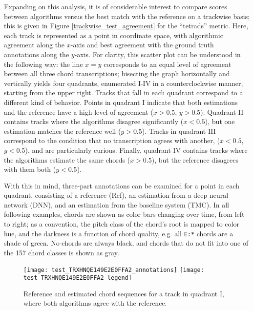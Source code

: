 Expanding on this analysis, it is of considerable interest to compare scores between algorithms versus the best match with the reference on a trackwise basis; this is given in Figure \ref{trackwise_test_agreement} for the ``tetrads'' metric.
Here, each track is represented as a point in coordinate space, with algorithmic agreement along the $x$-axis and best agreement with the ground truth annotations along the $y$-axis.
For clarity, this scatter plot can be understood in the following way:
the line $x=y$ corresponds to an equal level of agreement between all three chord transcriptions;
bisecting the graph horizontally and vertically yields four quadrants, enumerated I-IV in a counterclockwise manner, starting from the upper right.
Tracks that fall in each quadrant correspond to a different kind of behavior.
Points in quadrant I indicate that both estimations and the reference have a high level of agreement ($x > 0.5$, $y > 0.5$).
Quadrant II contains tracks where the algorithms disagree significantly ($x < 0.5$), but one estimation matches the reference well ($y > 0.5$).
Tracks in quadrant III correspond to the condition that no transcription agrees with another, ($x < 0.5$, $y < 0.5$), and are particularly curious.
Finally, quadrant IV contains tracks where the algorithms estimate the same chords ($x > 0.5$), but the reference disagrees with them both ($y < 0.5$).

With this in mind, three-part annotations can be examined for a point in each quadrant, consisting of a reference (Ref), an estimation from a deep neural network (DNN), and an estimation from the baseline system (TMC).
In all following examples, chords are shown as color bars changing over time, from left to right;
as a convention, the pitch class of the chord's root is mapped to color hue, and the darkness is a function of chord quality, e.g. all \texttt{E:*} chords are a shade of green.
No-chords are always black, and chords that do not fit into one of the 157 chord classes is shown as gray.


\begin{figure}[t]
\centering
\texttt{[image: test\_TRXHNQE149E2E0FFA2\_annotations]}
\texttt{[image: test\_TRXHNQE149E2E0FFA2\_legend]}
\caption{Reference and estimated chord sequences for a track in quadrant I, where both algorithms agree with the reference.}
\label{fig:test_quadI}
\end{figure}


